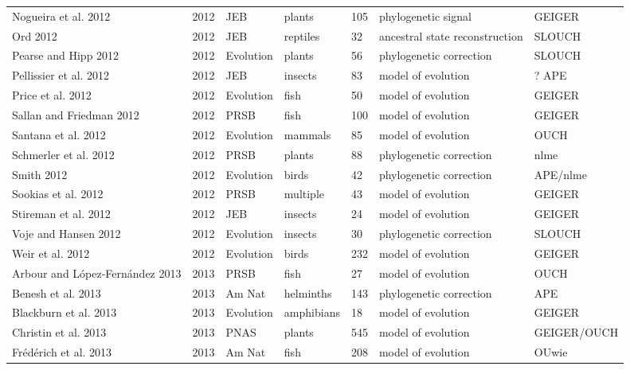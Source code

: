 \begin{landscape}
\begin{center}
\begin{longtable}{p{6cm}llllll}
Nogueira et al. 2012  &   2012    &   JEB &   plants  &   105 &   phylogenetic signal &   GEIGER  \\
Ord 2012  &   2012    &   JEB &   reptiles    &   32  &   ancestral state reconstruction  &   SLOUCH  \\
Pearse and Hipp 2012  &   2012    &   Evolution   &   plants  &   56  &   phylogenetic correction &   SLOUCH  \\
Pellissier et al. 2012    &   2012    &   JEB &   insects &   83  &   model of evolution  &   ? APE \\
Price et al. 2012 &   2012    &   Evolution   &   fish    &   50  &   model of evolution  &   GEIGER  \\
Sallan and Friedman 2012  &   2012    &   PRSB    &   fish    &   100 &   model of evolution  &   GEIGER  \\
Santana et al. 2012   &   2012    &   Evolution   &   mammals &   85  &   model of evolution  &   OUCH    \\
Schmerler et al. 2012 &   2012    &   PRSB    &   plants  &   88  &   phylogenetic correction &   nlme    \\
Smith 2012    &   2012    &   Evolution   &   birds   &   42  &   phylogenetic correction &   APE/nlme    \\
Sookias et al. 2012   &   2012    &   PRSB    &   multiple    &   43  &   model of evolution  &   GEIGER  \\
Stireman et al. 2012  &   2012    &   JEB &   insects &   24  &   model of evolution  &   GEIGER  \\
Voje and Hansen 2012  &   2012    &   Evolution   &   insects &   30  &   phylogenetic correction &   SLOUCH  \\
Weir et al. 2012  &   2012    &   Evolution   &   birds   &   232 &   model of evolution  &   GEIGER  \\
Arbour and L\'{o}pez-Fern\'{a}ndez 2013   &   2013    &   PRSB    &   fish    &   27  &   model of evolution  &   OUCH    \\
Benesh et al. 2013    &   2013    &   Am Nat  &   helminths   &   143 &   phylogenetic correction &   APE \\
Blackburn et al. 2013 &   2013    &   Evolution   &   amphibians  &   18  &   model of evolution  &   GEIGER  \\
Christin et al. 2013  &   2013    &   PNAS    &   plants  &   545 &   model of evolution  &   GEIGER/OUCH \\
Fr\'{e}d\'{e}rich et al. 2013 &   2013    &   Am Nat  &   fish    &   208 &   model of evolution  &   OUwie   \\

\end{longtable}
\end{center}
\end{landscape}
